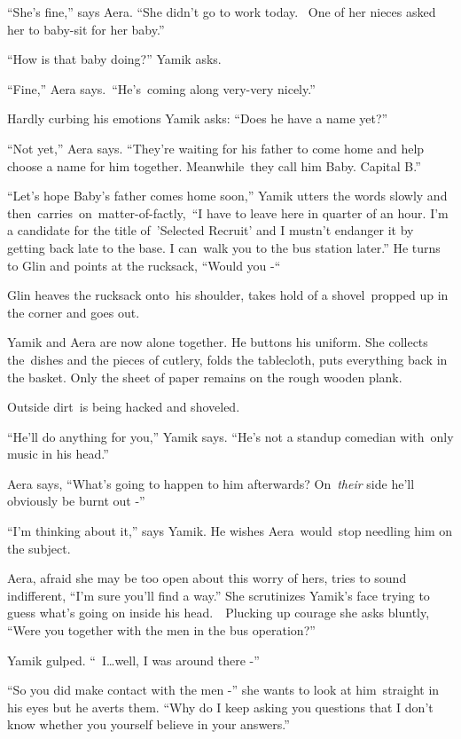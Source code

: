 \documentclass[twoside,11pt]{book}
\begin{document}
``She's fine,'' says Aera. ``She didn't go to work today.~ One of her nieces
asked her to baby-sit for her baby.'' 

``How is that baby doing?'' Yamik asks. 

``Fine,'' Aera says.\  ``He's\ coming along very{}-very nicely.'' 

Hardly curbing his emotions Yamik asks: ``Does he have a name yet?'' 

``Not yet,'' Aera says. ``They're waiting for his father to come home and help
choose a name for him together. Meanwhile{\ }they call him Baby. Capital
B.''

``Let's hope Baby's father comes home soon,'' Yamik utters the words slowly and
then\ carries\ on\ matter-of{}-factly,\ ``I have to leave here in quarter of an hour. I'm a candidate for
the title of\ {}'Selected Recruit{}' and I mustn't endanger it by getting back late to the base. I can~walk you to the
bus station later.'' He turns to Glin and points at the rucksack, ``Would you
-``\ 

Glin heaves the rucksack onto~his shoulder, takes hold of a shovel{\ }propped up
in the corner and goes out.

Yamik and Aera are now alone together. He buttons his uniform. She collects the~dishes and the pieces of cutlery, folds
the tablecloth, puts everything back in the basket. Only the sheet of paper remains on the rough wooden plank. 

Outside dirt{\ }is being hacked and shoveled. 

``He'll do anything for you,'' Yamik says. ``He's not a standup comedian
with{\ }only music in his head.'' 

Aera says, ``What's going to happen to him afterwards? On\ \textit{their} side he'll obviously be burnt out
-'' 

``I'm thinking about it,'' says Yamik. He wishes
Aera~would{\ }stop needling him on the subject.

Aera, afraid she may be too open about this worry of hers, tries to sound indifferent, ``I'm sure you'll
find a way.'' She scrutinizes Yamik's face trying to guess what's going on inside his head.\ \ Plucking up
courage she asks bluntly, ``Were you together with the men in the bus operation?'' 

Yamik gulped. ``\ I{\dots}well, I was around there {}-''

``So you did make contact with the men -'' she wants to look at
him{\ }straight in his eyes but he averts them. ``Why do I keep
asking you questions that I don't know whether you yourself believe in your answers.'' 
\end{document}
